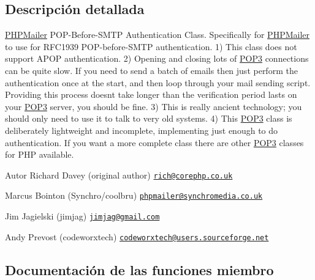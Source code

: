 \subsection{Descripción detallada}
\hyperlink{classPHPMailer_1_1PHPMailer_1_1PHPMailer}{P\+H\+P\+Mailer} P\+O\+P-\/\+Before-\/\+S\+M\+TP Authentication Class. Specifically for \hyperlink{classPHPMailer_1_1PHPMailer_1_1PHPMailer}{P\+H\+P\+Mailer} to use for R\+F\+C1939 P\+O\+P-\/before-\/\+S\+M\+TP authentication. 1) This class does not support A\+P\+OP authentication. 2) Opening and closing lots of \hyperlink{classPHPMailer_1_1PHPMailer_1_1POP3}{P\+O\+P3} connections can be quite slow. If you need to send a batch of emails then just perform the authentication once at the start, and then loop through your mail sending script. Providing this process doesn\textquotesingle{}t take longer than the verification period lasts on your \hyperlink{classPHPMailer_1_1PHPMailer_1_1POP3}{P\+O\+P3} server, you should be fine. 3) This is really ancient technology; you should only need to use it to talk to very old systems. 4) This \hyperlink{classPHPMailer_1_1PHPMailer_1_1POP3}{P\+O\+P3} class is deliberately lightweight and incomplete, implementing just enough to do authentication. If you want a more complete class there are other \hyperlink{classPHPMailer_1_1PHPMailer_1_1POP3}{P\+O\+P3} classes for P\+HP available.

\begin{DoxyAuthor}{Autor}
Richard Davey (original author) \href{mailto:rich@corephp.co.uk}{\tt rich@corephp.\+co.\+uk} 

Marcus Bointon (Synchro/coolbru) \href{mailto:phpmailer@synchromedia.co.uk}{\tt phpmailer@synchromedia.\+co.\+uk} 

Jim Jagielski (jimjag) \href{mailto:jimjag@gmail.com}{\tt jimjag@gmail.\+com} 

Andy Prevost (codeworxtech) \href{mailto:codeworxtech@users.sourceforge.net}{\tt codeworxtech@users.\+sourceforge.\+net} 
\end{DoxyAuthor}


\subsection{Documentación de las funciones miembro}
\mbox{\label{classPHPMailer_1_1PHPMailer_1_1POP3_a1a5462a218993658c91b6df0c39e641e}} 
